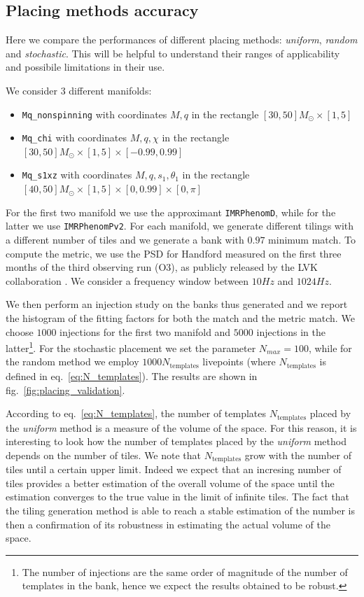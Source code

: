 \documentclass[twocolumn,showpacs,preprintnumbers,nofootinbib,prd,
superscriptaddress,10pt]{revtex4-2}
\begin{document}
\subsection{Placing methods accuracy} \label{sec:placing_accuracy}

Here we compare the performances of different placing methods: \textit{uniform}, \textit{random} and \textit{stochastic}.
This will be helpful to understand their ranges of applicability and possibile limitations in their use.

We consider 3 different manifolds:
\begin{itemize}
	\item \texttt{Mq\_nonspinning} with coordinates $M, q$ in the rectangle $[30, 50] M_\odot \times [1,5]$
	\item \texttt{Mq\_chi} with coordinates $M, q, \chi $ in the rectangle $[30, 50] M_\odot \times [1,5] \times [-0.99, 0.99]$
	\item \texttt{Mq\_s1xz} with coordinates $M, q, s_{1}, \theta_1$ in the rectangle $[40, 50] M_\odot \times [1,5] \times [0, 0.99] \times [0,\pi]$
\end{itemize}
For the first two manifold we use the approximant \texttt{IMRPhenomD}, while for the latter we use \texttt{IMRPhenomPv2}.
For each manifold, we generate different tilings with a different number of tiles and we generate a bank with $0.97$ minimum match.
To compute the metric, we use the PSD for Handford measured on the first three months of the third observing run (O3), as publicly released by the LVK collaboration \cite{O3a_PSDs}.
We consider a frequency window between $10Hz$ and $1024Hz$.

We then perform an injection study on the banks thus generated and we report the histogram of the fitting factors for both the match and the metric match. We choose $1000$ injections for the first two manifold and $5000$ injections in the latter\footnote{
The number of injections are the same order of magnitude of the number of templates in the bank, hence we expect the results obtained to be robust.}.
For the stochastic placement we set the parameter $N_{max} = 100$, while for the random method we employ $1000 N_{\text{templates}}$ livepoints (where $N_{\text{templates}}$ is defined in eq.~\eqref{eq:N_templates}).
The results are shown in fig.~\ref{fig:placing_validation}.

According to eq.~\eqref{eq:N_templates}, the number of templates $N_{\text{templates}}$ placed by the {\it uniform} method is a measure of the volume of the space. For this reason, it is interesting to look how the number of templates placed by the {\it uniform} method depends on the number of tiles.
We note that $N_{\text{templates}}$ grow with the number of tiles until a certain upper limit. Indeed we expect that an incresing number of tiles provides a better estimation of the overall volume of the space until the estimation converges to the true value in the limit of infinite tiles. 
The fact that the tiling generation method is able to reach a stable estimation of the number is then a confirmation of its robustness in estimating the actual volume of the space.
\end{document}
